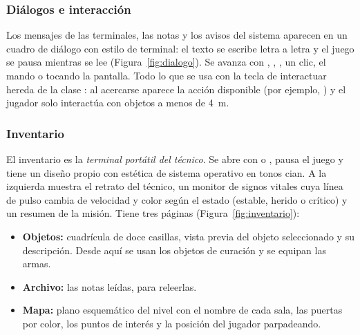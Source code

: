 
\subsubsection{Diálogos e interacción}

Los mensajes de las terminales, las notas y los avisos del sistema aparecen en un cuadro de diálogo
con estilo de terminal: el texto se escribe letra a letra y el juego se pausa mientras se lee
(Figura~\ref{fig:dialogo}). Se avanza con , , , un clic, el
mando o tocando la pantalla. Todo lo que se usa con la tecla de interactuar hereda de la clase
: al acercarse aparece la acción disponible (por ejemplo, ) y el jugador solo interactúa con objetos a menos de 4~m.


\subsubsection{Inventario}

El inventario es la \textit{terminal portátil del técnico}. Se abre con  o ,
pausa el juego y tiene un diseño propio con estética de sistema operativo en tonos cian. A la
izquierda muestra el retrato del técnico, un monitor de signos vitales cuya línea de pulso cambia de
velocidad y color según el estado (estable, herido o crítico) y un resumen de la misión. Tiene tres
páginas (Figura~\ref{fig:inventario}):

\begin{itemize}
  \item \textbf{Objetos:} cuadrícula de doce casillas, vista previa del objeto seleccionado y su
        descripción. Desde aquí se usan los objetos de curación y se equipan las armas.
  \item \textbf{Archivo:} las notas leídas, para releerlas.
  \item \textbf{Mapa:} plano esquemático del nivel con el nombre de cada sala, las puertas por
        color, los puntos de interés y la posición del jugador parpadeando.
\end{itemize}


